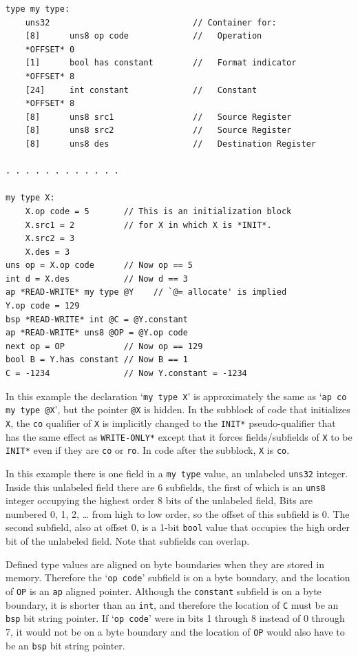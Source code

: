 \documentclass[12pt]{article}
\newenvironment{indpar}[1][0.3in]%
	{\begin{list}{}%
		     {\setlength{\itemsep}{0in}%
		      \setlength{\topsep}{0in}%
		      \setlength{\parsep}{1ex}%
		      \setlength{\labelwidth}{#1}%
		      \setlength{\leftmargin}{#1}%
		      \addtolength{\leftmargin}{\labelsep}}%
	 \item}%
	{\end{list}}
\begin{document}
\begin{indpar}\begin{verbatim}
type my type:
    uns32                             // Container for:
    [8]      uns8 op code             //   Operation
    *OFFSET* 0
    [1]      bool has constant        //   Format indicator
    *OFFSET* 8
    [24]     int constant             //   Constant
    *OFFSET* 8
    [8]      uns8 src1                //   Source Register
    [8]      uns8 src2                //   Source Register
    [8]      uns8 des                 //   Destination Register

. . . . . . . . . . . .

my type X:
    X.op code = 5       // This is an initialization block
    X.src1 = 2          // for X in which X is *INIT*.
    X.src2 = 3
    X.des = 3
uns op = X.op code      // Now op == 5
int d = X.des           // Now d == 3
ap *READ-WRITE* my type @Y    // `@= allocate' is implied
Y.op code = 129
bsp *READ-WRITE* int @C = @Y.constant
ap *READ-WRITE* uns8 @OP = @Y.op code
next op = OP            // Now op == 129
bool B = Y.has constant // Now B == 1
C = -1234               // Now Y.constant = -1234
\end{verbatim}\end{indpar}

In this example the declaration `{\tt my type X}' is approximately the same as
`{\tt ap co my type @X}', but the pointer {\tt @X} is hidden.
In the subblock of code that initializes {\tt X}, the {\tt co} qualifier
of {\tt X} is implicitly changed to the {\tt *INIT*} pseudo-qualifier that
has the same effect as {\tt *WRITE-ONLY*}
except that it forces fields/subfields of {\tt X} to be {\tt *INIT*}
even if they are {\tt co} or {\tt ro}.  In code after the subblock,
{\tt X} is {\tt co}.

In this example there is one field in a {\tt my type} value,
an unlabeled {\tt uns32} integer.
Inside this unlabeled field there are 6 subfields, the first of which is
an {\tt uns8} integer occupying the highest order 8
bits of the unlabeled field,
Bits are numbered 0, 1, 2, \ldots{} from high to low order, so the
offset of this subfield is 0.  The second subfield, also at offset 0,
is a 1-bit {\tt bool}
value that occupies the high order bit of the unlabeled field.
Note that subfields can overlap.

Defined type values are aligned on byte boundaries when
they are stored in memory.  Therefore the `{\tt op code}' subfield
is on a byte boundary, and
the location of {\tt OP} is an {\tt ap} aligned pointer.  Although
the {\tt constant} subfield is on a byte boundary, it is
shorter than an {\tt int}, and therefore the
location of {\tt C} must be an {\tt bsp} bit string pointer.
If `{\tt op code}' were in bits 1 through 8 instead of 0 through 7, it would
not be on a byte boundary and the location of {\tt OP} would
also have to be an {\tt bsp} bit string pointer.
\end{document}
